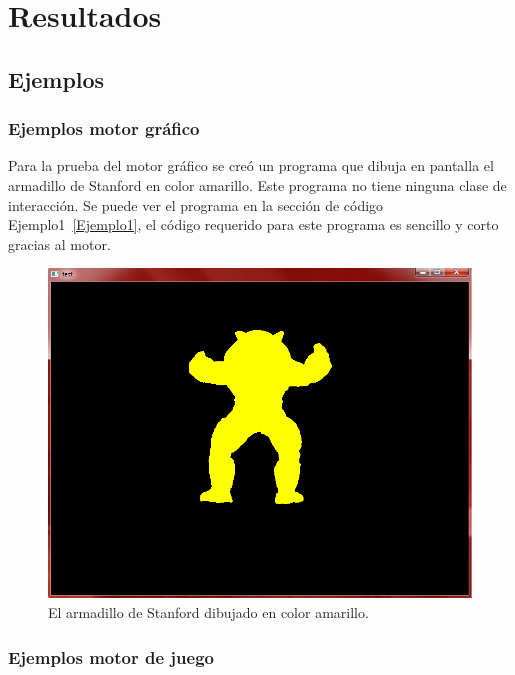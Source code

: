 
\chapter{Resultados}

\ifpdf
    \graphicspath{{resultados/Figs/Raster/}{resultados/Figs/PDF/}{resultados/Figs/}}
\else
    \graphicspath{{resultados/Figs/Vector/}{resultados/Figs/}}
\fi

\section{Ejemplos}

\subsection{Ejemplos motor gráfico}

Para la prueba del motor gráfico se creó un programa que dibuja en pantalla el armadillo de Stanford en color amarillo. Este programa no tiene ninguna clase de interacción. Se puede ver el programa en la sección de código Ejemplo1~\ref{Ejemplo1}, el código requerido para este programa es sencillo y corto gracias al motor.

\begin{figure}[htbp!]
\centering
\includegraphics[width=1.0\textwidth]{sceenshot1}
\caption[Ejemplo 1]{El armadillo de Stanford dibujado en color amarillo.}
\end{figure}

\subsection{Ejemplos motor de juego}

